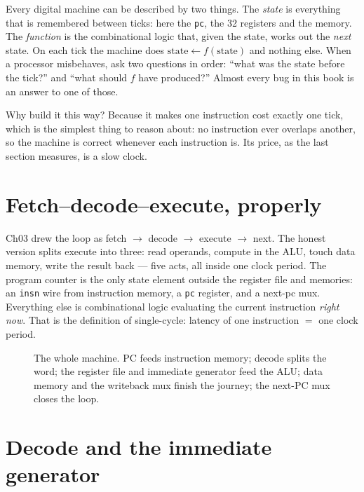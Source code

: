 \begin{principle}
Every digital machine can be described by two things. The
\emph{state} is everything that is remembered between ticks: here the
\texttt{pc}, the 32 registers and the memory. The \emph{function} is
the combinational logic that, given the state, works out the
\emph{next} state. On each tick the machine does
$\text{state}\leftarrow f(\text{state})$ and nothing else. When a
processor misbehaves, ask two questions in order: ``what was the state
before the tick?'' and ``what should $f$ have produced?'' Almost every
bug in this book is an answer to one of those.
\end{principle}

Why build it this way? Because it makes one instruction cost exactly
one tick, which is the simplest thing to reason about: no instruction
ever overlaps another, so the machine is correct whenever each
instruction is. Its price, as the last section measures, is a slow
clock.

\section{Fetch--decode--execute, properly}
\label{sec:fde05}

Ch03 drew the loop as fetch $\to$ decode $\to$ execute $\to$ next.
The honest version splits execute into three: read operands, compute
in the ALU, touch data memory, write the result back --- five acts,
all inside one clock period. The program counter is the only state
element outside the register file and memories: an \texttt{insn} wire
from instruction memory, a \texttt{pc} register, and a next-pc mux.
Everything else is combinational logic evaluating the current
instruction \emph{right now}. That is the definition of
single-cycle: latency of one instruction $=$ one clock period.

\begin{figure}[t]
\centering

\caption[Single-cycle datapath]{The whole machine. PC feeds
instruction memory; decode splits the word; the register file and
immediate generator feed the ALU; data memory and the writeback mux
finish the journey; the next-PC mux closes the loop.}
\label{fig:datapath05}
\end{figure}

\section{Decode and the immediate generator}
\label{sec:decode05}

